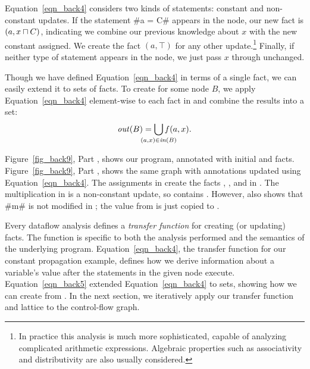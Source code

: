 \documentclass[12pt]{report}
\begin{document}
Equation~\eqref{eqn_back4} considers two kinds of statements: constant
and non-constant updates. If the statement #a = C# appears in the
node, our new fact is $(a,x \lub C)$, indicating we combine our
previous knowledge about $x$ with the new constant assigned. We create
the fact $(a,\top)$ for any other update.\footnote{In practice this
  analysis is much more sophisticated, capable of analyzing
  complicated arithmetic expressions. Algebraic properties such as
  associativity and distributivity are also usually considered.}
Finally, if neither type of statement appears in the node, we just
pass $x$ through unchanged.

Though we have defined Equation~\eqref{eqn_back4} in terms of a single
fact, we can easily extend it to sets of facts. To create \outBa for
some node $B$, we apply Equation~\eqref{eqn_back4} element-wise to
each fact in \inBa and combine the results into a set:
\begin{equation}
  \outBa = \bigcup\limits_{\mathclap{(a,x) \in \inBa}} f(a,x).
  \label{eqn_back5}
\end{equation}

Figure~\ref{fig_back9}, Part , shows our
program, annotated with initial \inE and \out
facts. Figure~\ref{fig_back9}, Part , shows
the same graph with annotations updated using
Equation~\eqref{eqn_back4}. The assignments in
 create the facts ,
, and  in . The
multiplication in  is a non-constant update,
so  contains . However,
 also shows that #m# is not modified in
; the value from  is
just copied to .



Every dataflow analysis defines a \emph{transfer function} for
creating (or updating) facts. The function is specific to both the
analysis performed and the semantics of the underlying
program. Equation~\eqref{eqn_back4}, the transfer function for our
constant propagation example, defines how we derive information about
a variable's value after the statements in the given node execute.
Equation~\eqref{eqn_back5} extended Equation~\eqref{eqn_back4} to sets,
showing how we can create \outBa from \inBa. In the next section, we
iteratively apply our transfer function and lattice to the
control-flow graph. 
\end{document}
